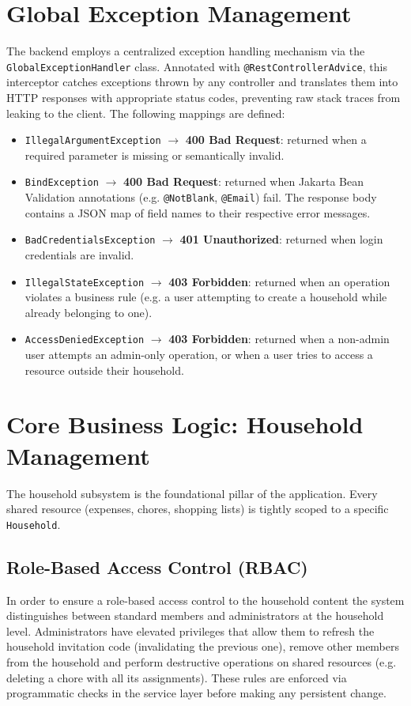 \section{Global Exception Management}
The backend employs a centralized exception handling mechanism via the \texttt{GlobalExceptionHandler} class. Annotated with \texttt{@RestControllerAdvice}, this interceptor catches exceptions thrown by any controller and translates them into HTTP responses with appropriate status codes, preventing raw stack traces from leaking to the client. The following mappings are defined:

\begin{itemize}
    \item \texttt{IllegalArgumentException} $\rightarrow$ \textbf{400 Bad Request}: returned when a required parameter is missing or semantically invalid.
    \item \texttt{BindException} $\rightarrow$ \textbf{400 Bad Request}: returned when Jakarta Bean Validation annotations (e.g. \texttt{@NotBlank}, \texttt{@Email}) fail. The response body contains a JSON map of field names to their respective error messages.
    \item \texttt{BadCredentialsException} $\rightarrow$ \textbf{401 Unauthorized}: returned when login credentials are invalid.
    \item \texttt{IllegalStateException} $\rightarrow$ \textbf{403 Forbidden}: returned when an operation violates a business rule (e.g. a user attempting to create a household while already belonging to one).
    \item \texttt{AccessDeniedException} $\rightarrow$ \textbf{403 Forbidden}: returned when a non-admin user attempts an admin-only operation, or when a user tries to access a resource outside their household.
\end{itemize}

\section{Core Business Logic: Household Management}
\label{sec:core-household_management}
The household subsystem is the foundational pillar of the application. Every shared resource (expenses, chores, shopping lists) is tightly scoped to a specific \texttt{Household}.

\subsection{Role-Based Access Control (RBAC)}
In order to ensure a role-based access control to the household content the system distinguishes between standard members and administrators at the household level. Administrators have elevated privileges that allow them to refresh the household invitation code (invalidating the previous one), remove other members from the household and perform destructive operations on shared resources (e.g. deleting a chore with all its assignments).
These rules are enforced via programmatic checks in the service layer before making any persistent change.

